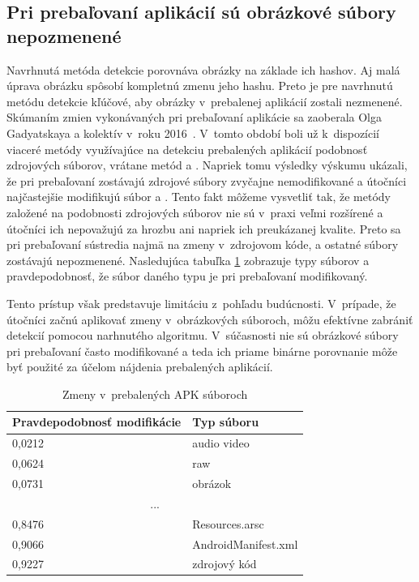 \subsection*{Pri prebaľovaní aplikácií sú obrázkové súbory nepozmenené}
Navrhnutá metóda detekcie porovnáva obrázky na základe ich hashov. Aj malá úprava obrázku spôsobí kompletnú zmenu jeho hashu. Preto je pre navrhnutú metódu detekcie kľúčové, aby obrázky v~prebalenej aplikácií zostali nezmenené. Skúmaním zmien vykonávaných pri prebaľovaní aplikácie sa zaoberala Olga Gadyatskaya a kolektív v~roku 2016~\cite{Gadyatskaya2016}. V~tomto období boli už k~dispozícií viaceré metódy využívajúce na detekciu prebalených aplikácií podobnosť zdrojových súborov, vrátane metód  a . Napriek tomu výsledky výskumu ukázali, že pri prebaľovaní zostávajú zdrojové súbory zvyčajne nemodifikované a útočníci najčastejšie modifikujú súbor  a . Tento fakt môžeme vysvetliť tak, že metódy založené na podobnosti zdrojových súborov nie sú v~praxi veľmi rozšírené a útočníci ich nepovažujú za hrozbu ani napriek ich preukázanej kvalite. Preto sa pri prebaľovaní sústredia najmä na zmeny v~zdrojovom kóde, a ostatné súbory zostávajú nepozmenené. Nasledujúca tabuľka \ref{repacakged-changes} zobrazuje typy súborov a pravdepodobnosť, že súbor daného typu je pri prebaľovaní modifikovaný. 

Tento prístup však predstavuje limitáciu z~pohľadu budúcnosti. V~prípade, že útočníci začnú aplikovať zmeny v~obrázkových súboroch, môžu efektívne zabrániť detekcií pomocou narhnutého algoritmu. V~súčasnosti nie sú obrázkové súbory pri prebaľovaní často modifikované a teda ich priame binárne porovnanie môže byť použité za účelom nájdenia prebalených aplikácií.

\begin{table}[H]
\centering
\begin{tabular}{|l|l|}
\hline
\textbf{Pravdepodobnosť modifikácie} & \textbf{Typ súboru}          \\ \hline
0,0212                                      & audio video         \\
0,0624                                      & raw                 \\
0,0731                                      & obrázok             \\
\multicolumn{2}{|c|}{...} \\
0,8476                                      & Resources.arsc      \\
0,9066                                      & AndroidManifest.xml \\
0,9227                                      & zdrojový kód        \\
\hline
\end{tabular}
\caption{Zmeny v~prebalených APK súboroch}
\label{repacakged-changes}
\end{table}

